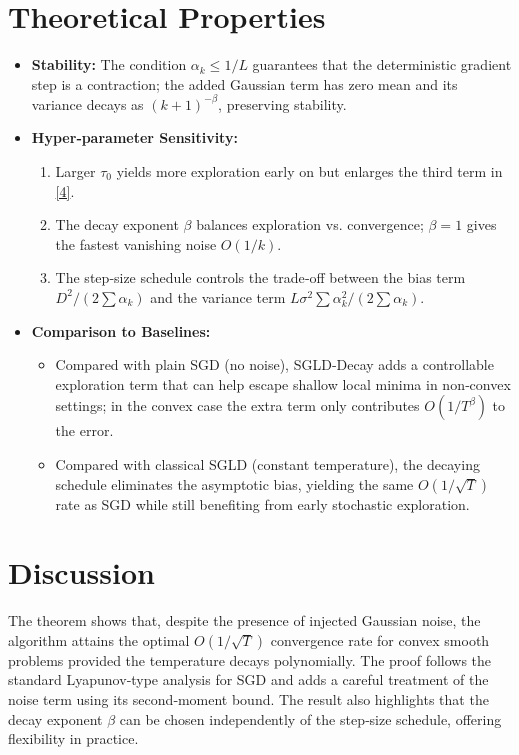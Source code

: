 \documentclass{article}
\begin{document}
\section*{Theoretical Properties}
\begin{itemize}
\item \textbf{Stability:} The condition $\alpha_{k}\le 1/L$ guarantees that the deterministic gradient step is a contraction; the added Gaussian term has zero mean and its variance decays as $(k+1)^{-\beta}$, preserving stability.
\item \textbf{Hyper‑parameter Sensitivity:}
    \begin{enumerate}[label=\alph*)]
    \item Larger $\tau_{0}$ yields more exploration early on but enlarges the third term in \eqref{4}.
    \item The decay exponent $\beta$ balances exploration vs. convergence; $\beta=1$ gives the fastest vanishing noise $O(1/k)$.
    \item The step‑size schedule controls the trade‑off between the bias term $D^{2}/(2\sum\alpha_{k})$ and the variance term $L\sigma^{2}\sum\alpha_{k}^{2}/(2\sum\alpha_{k})$.
    \end{enumerate}
\item \textbf{Comparison to Baselines:}
    \begin{itemize}
    \item Compared with plain SGD (no noise), SGLD‑Decay adds a controllable exploration term that can help escape shallow local minima in non‑convex settings; in the convex case the extra term only contributes $O(1/T^{\beta})$ to the error.
    \item Compared with classical SGLD (constant temperature), the decaying schedule eliminates the asymptotic bias, yielding the same $O(1/\sqrt{T})$ rate as SGD while still benefiting from early stochastic exploration.
    \end{itemize}
\end{itemize}

\section*{Discussion}
The theorem shows that, despite the presence of injected Gaussian noise, the algorithm attains the optimal $O(1/\sqrt{T})$ convergence rate for convex smooth problems provided the temperature decays polynomially. The proof follows the standard Lyapunov‑type analysis for SGD and adds a careful treatment of the noise term using its second‑moment bound. The result also highlights that the decay exponent $\beta$ can be chosen independently of the step‑size schedule, offering flexibility in practice.
\end{document}
